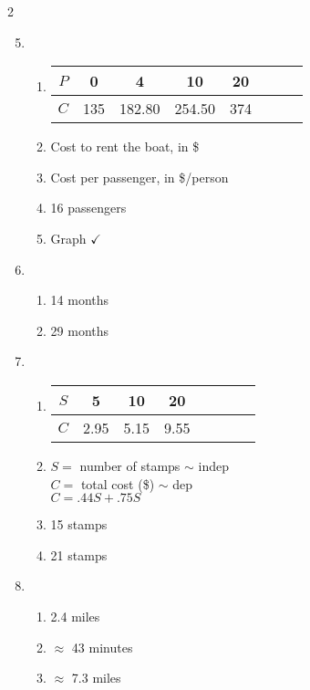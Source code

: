 \begin{multicols} {2}
\begin{enumerate}
\setcounter{enumi}{4}

\item %
\begin{enumerate}
\item  \begin{tabular} {|c| |c|c |c|c |c|c |c|}\hline
$P$ & 0 & 4 & 10 & 20  \\ \hline
$C$ & 135 & 182.80 & 254.50 & 374\\ \hline
\end{tabular}
\item Cost to rent the boat, in \$
\item Cost per passenger, in \$/person
\item 16 passengers
\item Graph $\checkmark$
\end{enumerate}

\item  %
\begin{enumerate}
\item 14 months
\item 29 months
\end{enumerate}

\item %
\begin{enumerate}
\item \begin{tabular} {|c| |c|c |c|c |c|c |c|}\hline
$S$ & 5 & 10 & 20\\ \hline
$C$ & 2.95 & 5.15 & 9.55 \\ \hline
\end{tabular}
\item $S=$ number of stamps $\sim$ indep \\ $C=$ total cost (\$) $\sim$ dep \\ $C = .44S + .75S$
\item 15 stamps
\item 21 stamps
\end{enumerate}

\item %
\begin{enumerate}
\item 2.4 miles
\item $\approx$ 43 minutes
\item $\approx$ 7.3 miles
\end{enumerate}


\end{enumerate}
\end{multicols}
